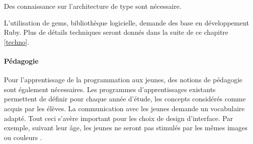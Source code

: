 Des connaissance sur l'architecture de type  sont nécessaire.

L'utilisation de \glspl{gem}, bibliothèque logicielle, demande des base en développement Ruby. Plus de détails techniques seront donnés dans la suite de ce chapitre \ref{techno}. %

\paragraph{Pédagogie}
Pour l'apprentissage de la programmation aux jeunes, des notions de pédagogie sont également nécessaires. 
Les programmes d'apprentissages existants permettent de définir pour chaque année d'étude, les concepts considérés comme acquis par les élèves. La communication avec les jeunes demande un vocabulaire adapté. Tout ceci s'avère important pour les choix de design d'interface. Par exemple, suivant leur âge, les jeunes ne seront pas stimulés par les mêmes images ou couleurs \cite{color}. %


